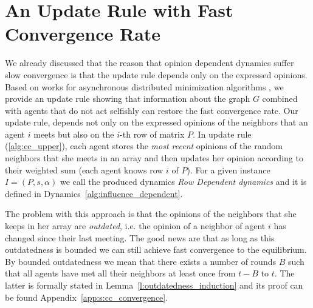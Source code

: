 \section{An Update Rule with Fast Convergence Rate}\label{s:cc_convergence}

We already discussed that the reason that opinion dependent dynamics suffer slow
convergence is that the update rule depends only on the expressed opinions.
Based on works for asynchronous distributed minimization algorithms \cite{BT97,CC16},
we provide an update rule showing that information about the
graph $G$ combined with agents that do not act selfishly can restore the
fast convergence rate.
Our update rule, depends not only on the expressed opinions of the
neighbors that an agent $i$ meets but also on the $i$-th row of matrix $P$.
In update rule (\ref{alg:cc_upper}), each agent stores the
\emph{most recent} opinions of the random neighbors that she meets in an array
and then updates her opinion according to their weighted sum
(each agent knows row $i$ of $P$). For a given instance
$I=(P,s,\alpha)$ we call the produced dynamics \emph{Row Dependent dynamics}
and it is defined in Dynamics~\ref{alg:influence_dependent}.

The problem with this approach is that the opinions of the neighbors
that she keeps in her array are \emph{outdated}, i.e. the opinion of
a neighbor of agent $i$ has changed since their last meeting.
The good news are that as long as this outdatedness
is bounded we can still achieve fast convergence to the
equilibrium.  By bounded outdatedness we mean that there exists a
number of rounds $B$ such that all agents have met all their neighbors
at least once from $t-B$ to $t$. The latter is formally stated in
Lemma~\ref{l:outdatedness_induction} and its proof can be found
Appendix~\ref{app:s:cc_convergence}.

